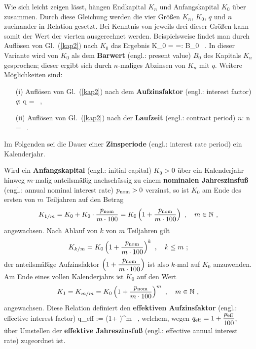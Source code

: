 \medskip
\noindent
Wie sich leicht zeigen l\"asst, h\"angen Endkapital
$K_{n}$ und Anfangskapital $K_{0}$ \"uber
%
\be
{}
\ee
%
zusammen. Durch diese Gleichung werden die vier Gr\"o\ss en
$K_{n}$, $K_{0}$, $q$ und $n$ zueinander in Relation gesetzt.
Bei Kenntnis von jeweils drei dieser Gr\"o\ss en kann somit
der Wert der vierten ausgerechnet werden. Beispielsweise
findet man durch Aufl\"osen von Gl.~(\ref{kap2}) nach $K_{0}$
das Ergebnis
%
\be
K_{0} =  =: B_{0} \ .
\ee
%
In dieser Variante wird von $K_{0}$ als dem {\bf Barwert} (engl.: 
present value) $B_{0}$ des Kapitals $K_{n}$ gesprochen; dieser 
ergibt sich durch $n$-maliges Abzinsen von $K_{n}$ mit $q$. Weitere
M\"oglichkeiten sind:
%
\begin{itemize}
\item[(i)] Aufl\"osen von Gl.~(\ref{kap2}) nach dem
{\bf Aufzinsfaktor} (engl.: interest factor) $q$:
%
\be
q =  \ ,
\ee
%
\item[(ii)] Aufl\"osen von Gl.~(\ref{kap2}) nach
der {\bf Laufzeit} (engl.: contract period) $n$:
%
\be
n =  \ .
\ee
%
\end{itemize}
%
Im Folgenden sei die Dauer einer {\bf Zinsperiode} (engl.: 
interest rate period) ein Kalenderjahr.

\medskip
\noindent
Wird ein {\bf Anfangskapital} (engl.: initial capital) $K_{0}>0$ 
\"uber ein Kalenderjahr hinweg $m$-malig anteilsm\"a\ss ig 
nachsch\"ussig zu einem {\bf nominalen Jahreszinsfu\ss} (engl.: 
annual nominal interest rate) $p_{\rm nom}>0$ verzinst, so ist 
$K_{0}$ am Ende des ersten von $m$ Teiljahren auf den Betrag
%
\[
K_{1/m} = K_{0} + K_{0}\cdot\frac{p_{\rm nom}}{m\cdot 100}
= K_{0}\left(1+\frac{p_{\rm nom}}{m\cdot 100}\right) \ ,
\quad
m \in \mathbb{N} \ ,
\]
%
angewachsen. Nach Ablauf von $k$ von $m$ Teiljahren gilt
%
\[
K_{k/m} = K_{0}\left(1+\frac{p_{\rm nom}}{m\cdot 100}\right)^{k} \ ,
\quad
k \leq m \ ;
\]
%
der anteilsm\"a\ss ige Aufzinsfaktor $\displaystyle
\left(1+\frac{p_{\rm nom}}{m\cdot 100}\right)$
ist also $k$-mal auf $K_{0}$ anzuwenden.
Am Ende eines vollen Kalenderjahrs ist $K_{0}$ auf den Wert
%
\[
K_{1} = K_{m/m} = K_{0}\left(1+\frac{p_{\rm nom}}{m\cdot 100}
\right)^{m} \ , \quad
m \in \mathbb{N} \ ,
\]
%
angewachsen. Diese Relation definiert den {\bf effektiven
Aufzinsfaktor} (engl.: effective interest factor)
%
\be
{}
q_{\rm eff} := \left(1+
\right)^{m} \ ,
\ee
%
welchem, wegen $\displaystyle
q_{\rm eff}=1+\frac{p_{\rm eff}}{100}$, \"uber Umstellen
der {\bf effektive Jahreszinsfu\ss} (engl.: effective annual 
interest rate)
%
\be
{}
\ee
%
zugeordnet ist.

